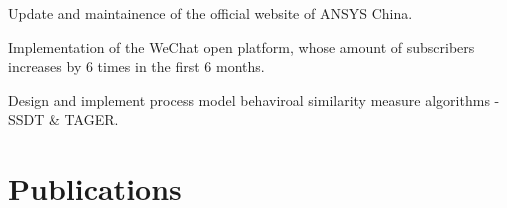 \documentclass[]{resume_en}
\begin{document}
\begin{minipage}[t]{0.66\textwidth}
\begin{tightemize}
\item Update and maintainence of the official website of ANSYS China.
\item Implementation of the WeChat open platform, whose amount of subscribers increases by 6 times in the first 6 months.
\end{tightemize}
\sectionsep

\begin{tightemize}
\item Design and implement process model behaviroal similarity measure algorithms - SSDT \& TAGER.
\end{tightemize}



\section{Publications} 
\renewcommand\refname{\vskip -1.6cm} %


\nocite{*}

\end{minipage} 
\end{document}
